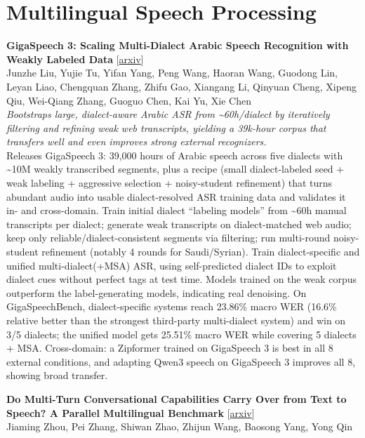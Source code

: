 \documentclass[12pt,letterpaper]{article}
\begin{document}
\medskip


\section*{Multilingual Speech Processing}

{\small\textbf{GigaSpeech 3: Scaling Multi-Dialect Arabic Speech Recognition with Weakly Labeled Data}} {\scriptsize[\href{https://arxiv.org/abs/2611.02476}{arxiv}]}\\
{\scriptsize Junzhe Liu, Yujie Tu, Yifan Yang, Peng Wang, Haoran Wang, Guodong Lin, Leyan Liao, Chengquan Zhang, Zhifu Gao, Xiangang Li, Qinyuan Cheng, Xipeng Qiu, Wei-Qiang Zhang, Guoguo Chen, Kai Yu, Xie Chen}\\

{\small\textit{Bootstraps large, dialect-aware Arabic ASR from \textasciitilde{}60h/dialect by iteratively filtering and refining weak web transcripts, yielding a 39k-hour corpus that transfers well and even improves strong external recognizers.}}\\[1pt]
{\footnotesize Releases GigaSpeech 3: 39,000 hours of Arabic speech across five dialects with \textasciitilde{}10M weakly transcribed segments, plus a recipe (small dialect-labeled seed + weak labeling + aggressive selection + noisy-student refinement) that turns abundant audio into usable dialect-resolved ASR training data and validates it in- and cross-domain. Train initial dialect ``labeling models'' from \textasciitilde{}60h manual transcripts per dialect; generate weak transcripts on dialect-matched web audio; keep only reliable/dialect-consistent segments via filtering; run multi-round noisy-student refinement (notably 4 rounds for Saudi/Syrian). Train dialect-specific and unified multi-dialect(+MSA) ASR, using self-predicted dialect IDs to exploit dialect cues without perfect tags at test time. Models trained on the weak corpus outperform the label-generating models, indicating real denoising. On GigaSpeechBench, dialect-specific systems reach 23.86\% macro WER (16.6\% relative better than the strongest third-party multi-dialect system) and win on 3/5 dialects; the unified model gets 25.51\% macro WER while covering 5 dialects + MSA. Cross-domain: a Zipformer trained on GigaSpeech 3 is best in all 8 external conditions, and adapting Qwen3 speech on GigaSpeech 3 improves all 8, showing broad transfer.}

\medskip

{\small\textbf{Do Multi-Turn Conversational Capabilities Carry Over from Text to Speech? A Parallel Multilingual Benchmark}} {\scriptsize[\href{https://arxiv.org/abs/2611.04390}{arxiv}]}\\
{\scriptsize Jiaming Zhou, Pei Zhang, Shiwan Zhao, Zhijun Wang, Baosong Yang, Yong Qin}\\
\end{document}
